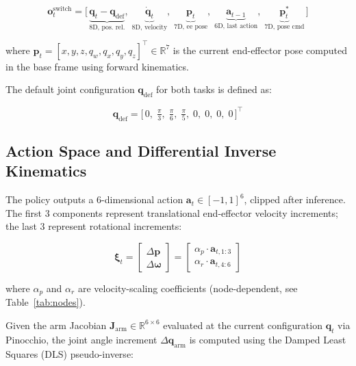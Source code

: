 \documentclass[12pt, a4paper]{article}
\begin{document}
\begin{equation}
  \mathbf{o}_t^{\text{switch}} = \bigl[\,
    \underbrace{\mathbf{q}_t - \mathbf{q}_{\text{def}}}_{\text{8D, pos. rel.}},\;
    \underbrace{\dot{\mathbf{q}}_t}_{\text{8D, velocity}},\;
    \underbrace{\mathbf{p}_t}_{\text{7D, ee pose}},\;
    \underbrace{\mathbf{a}_{t-1}}_{\text{6D, last action}},\;
    \underbrace{\mathbf{p}^*_t}_{\text{7D, pose cmd}}
  \,\bigr]
  \label{eq:obs_switch}
\end{equation}

where $\mathbf{p}_t = [x, y, z, q_w, q_x, q_y, q_z]^\top \in \mathbb{R}^7$ is the current end-effector pose computed in the base frame using forward kinematics.

The default joint configuration $\mathbf{q}_{\text{def}}$ for both tasks is defined as:

\begin{equation}
  \mathbf{q}_{\text{def}} = \bigl[\,0,\;\tfrac{\pi}{3},\;\tfrac{\pi}{6},\;\tfrac{\pi}{5},\;0,\;0,\;0,\;0\,\bigr]^\top
  \label{eq:qdef}
\end{equation}

\subsection{Action Space and Differential Inverse Kinematics}
\label{ssec:action}

The policy outputs a 6-dimensional action $\mathbf{a}_t \in [-1, 1]^6$, clipped after
inference. The first 3 components represent translational end-effector velocity
increments; the last 3 represent rotational increments:

\begin{equation}
  \boldsymbol{\xi}_t =
  \begin{bmatrix} \Delta \mathbf{p} \\ \Delta \boldsymbol{\omega} \end{bmatrix}
  =
  \begin{bmatrix}
    \alpha_p \cdot \mathbf{a}_{t,1:3} \\
    \alpha_r \cdot \mathbf{a}_{t,4:6}
  \end{bmatrix}
  \label{eq:delta_pose}
\end{equation}

where $\alpha_p$ and $\alpha_r$ are velocity-scaling coefficients (node-dependent,
see Table~\ref{tab:nodes}).

Given the arm Jacobian $\mathbf{J}_{\text{arm}} \in \mathbb{R}^{6 \times 6}$ evaluated
at the current configuration $\mathbf{q}_t$ via Pinocchio, the joint angle increment
$\Delta \mathbf{q}_{\text{arm}}$ is computed using the Damped Least Squares (DLS)
pseudo-inverse:
\end{document}
